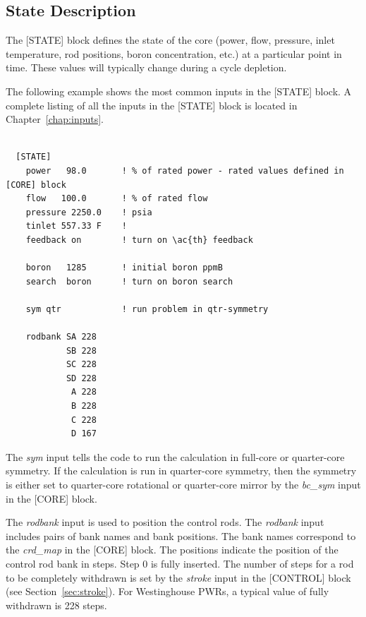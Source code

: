 %
%
\subsection{State Description}

The [STATE] block defines the state of the core
(power, flow, pressure, inlet temperature, rod positions, boron concentration, etc.)
at a particular point in time.
These values will typically change during a cycle depletion.

The following example shows the most common inputs in the [STATE] block.
A complete listing of all the inputs in the [STATE] block is located in Chapter~\ref{chap:inputs}.

\begin{Verbatim}[fontsize=\small]

  [STATE]
    power   98.0       ! % of rated power - rated values defined in [CORE] block
    flow   100.0       ! % of rated flow
    pressure 2250.0    ! psia
    tinlet 557.33 F    !
    feedback on        ! turn on \ac{th} feedback

    boron   1285       ! initial boron ppmB
    search  boron      ! turn on boron search

    sym qtr            ! run problem in qtr-symmetry

    rodbank SA 228
            SB 228
            SC 228
            SD 228
             A 228
             B 228
             C 228
             D 167

\end{Verbatim}

The {\it sym} input tells the code to run the calculation in full-core or
quarter-core symmetry. If the calculation is run in quarter-core symmetry, then the symmetry is either
set to quarter-core rotational or quarter-core mirror by the {\it bc\_sym} input in the [CORE] block.

The {\it rodbank} input is used to position the control rods. The {\it rodbank} input includes pairs of bank names
and bank positions. The bank names correspond to the {\it crd\_map} in the [CORE] block.
The positions indicate the position of the control rod bank in steps.
Step 0 is fully inserted.
The number of steps for a rod to be completely withdrawn is set by the {\it stroke} input in
the [CONTROL] block (see Section~\ref{sec:stroke}). For Westinghouse PWRs, a typical value of fully withdrawn is 228 steps.


